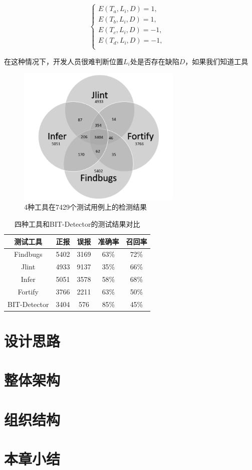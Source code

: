 \begin{equation}  
	\left\{  
	\begin{array}{lr}  
	E(T_{a},L_{i},D)=1, &  \\  
	E(T_{b},L_{i},D)=1, &  \\  
	E(T_{c},L_{i},D)=-1, &  \\  
	E(T_{d},L_{i},D)=-1, &  \\  
	\end{array}  
	\right.  
\end{equation} 

在这种情况下，开发人员很难判断位置$L_i$处是否存在缺陷$D$，如果我们知道工具



\begin{figure}
	\centering
	\includegraphics[width=0.70\textwidth]{figures/vnfigure3-1}
	\caption{4种工具在7429个测试用例上的检测结果}\label{fig:figure3-1}
\end{figure}

\begin{table}
	\centering
	\caption{四种工具和BIT-Detector的测试结果对比} \label{tab:table3-1}
	\begin{tabular*}{0.9\textwidth}{@{\extracolsep{\fill}}ccccc}
		\toprule
		测试工具	&正报	&误报	&准确率	&召回率 \\
		\midrule
		Findbugs	&5402	&3169	&63\%	&72\% \\
		Jlint	&4933	&9137	&35\%	&66\% \\
		Infer	&5051	&3578	&58\%	&68\% \\
		Fortify	&3766	&2211	&63\%	&50\% \\
		BIT-Detector	&3404	&576	&85\%	&45\% \\
		\bottomrule
	\end{tabular*}
\end{table}
\section{设计思路}
\section{整体架构}
\section{组织结构}
\section{本章小结}